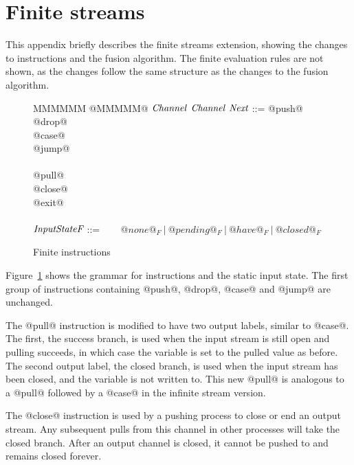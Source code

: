 \eject
\appendix

\section{Finite streams}
\label{s:FiniteDetails}

This appendix briefly describes the finite streams extension, showing the changes to instructions and the fusion algorithm.
The finite evaluation rules are not shown, as the changes follow the same structure as the changes to the fusion algorithm.

\begin{figure}
\begin{tabbing}
MMMMMM \TABDEF @MMMMM@  \TABSKIP $\textit{Channel}$ \TABSKIP $\textit{Channel}$ \TABSKIP $\textit{Next}$ \TABSKIP \kill
\Instr
    \> ::=\> @push@  \> \Chan  \> \Exp  \> \Next \\
    \TABALT  @drop@  \> \Chan  \>       \> \Next \\
    \TABALT  @case@  \> \Exp   \> \Next \> \Next \\
    \TABALT  @jump@  \>        \>       \> \Next \\
    \\
    \TABALT  @pull@  \> \Chan  \> \Var  \> \Next \> \Next \\
    \TABALT  @close@ \> \Chan  \>       \> \Next \\
    \TABALT  @exit@ 
\\
\\
$\textit{InputStateF}$ \> ::=  \> ~~~ $@none@_F ~|~ @pending@_F ~|~ @have@_F ~|~ @closed@_F$
\end{tabbing}
\caption{Finite instructions}
\label{fig:Finite:Instr}
\end{figure}

Figure~\ref{fig:Finite:Instr} shows the grammar for instructions and the static input state. The first group of instructions containing @push@, @drop@, @case@ and @jump@ are unchanged.

The @pull@ instruction is modified to have two output labels, similar to @case@. The first, the success branch, is used when the input stream is still open and pulling succeeds, in which case the variable is set to the pulled value as before. The second output label, the closed branch, is used when the input stream has been closed, and the variable is not written to. This new @pull@ is analogous to a @pull@ followed by a @case@ in the infinite stream version.

The @close@ instruction is used by a pushing process to close or end an output stream. Any subsequent pulls from this channel in other processes will take the closed branch. After an output channel is closed, it cannot be pushed to and remains closed forever.

